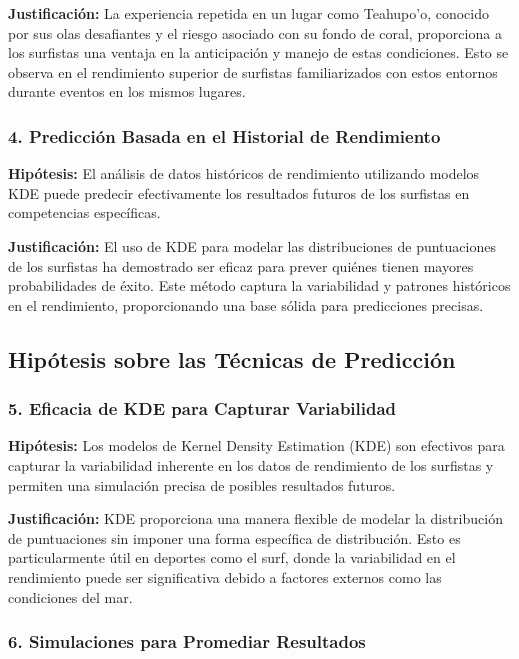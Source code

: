 \documentclass[12pt]{article}
\begin{document}
\textbf{Justificación:} La experiencia repetida en un lugar como Teahupo'o, conocido por sus olas desafiantes y el riesgo asociado con su fondo de coral, proporciona a los surfistas una ventaja en la anticipación y manejo de estas condiciones. Esto se observa en el rendimiento superior de surfistas familiarizados con estos entornos durante eventos en los mismos lugares.

\subsubsection*{4. Predicción Basada en el Historial de Rendimiento}

\textbf{Hipótesis:} El análisis de datos históricos de rendimiento utilizando modelos KDE puede predecir efectivamente los resultados futuros de los surfistas en competencias específicas.

\textbf{Justificación:} El uso de KDE para modelar las distribuciones de puntuaciones de los surfistas ha demostrado ser eficaz para prever quiénes tienen mayores probabilidades de éxito. Este método captura la variabilidad y patrones históricos en el rendimiento, proporcionando una base sólida para predicciones precisas.

\subsection*{Hipótesis sobre las Técnicas de Predicción}

\subsubsection*{5. Eficacia de KDE para Capturar Variabilidad}

\textbf{Hipótesis:} Los modelos de Kernel Density Estimation (KDE) son efectivos para capturar la variabilidad inherente en los datos de rendimiento de los surfistas y permiten una simulación precisa de posibles resultados futuros.

\textbf{Justificación:} KDE proporciona una manera flexible de modelar la distribución de puntuaciones sin imponer una forma específica de distribución. Esto es particularmente útil en deportes como el surf, donde la variabilidad en el rendimiento puede ser significativa debido a factores externos como las condiciones del mar.

\subsubsection*{6. Simulaciones para Promediar Resultados}
\end{document}
